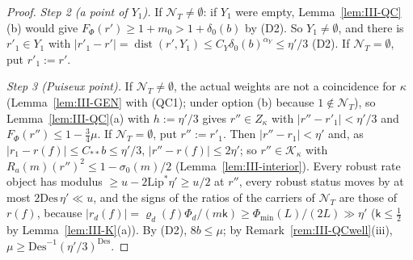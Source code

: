 \documentclass[10pt]{amsart}
\theoremstyle{definition}
\theoremstyle{remark}
\newcommand{\dist}{\operatorname{dist}}
\begin{document}
\begin{proof}
\emph{Step 2 (a point of $Y_1$).}  If $\mathcal N_T\ne\emptyset$: if $Y_1$ were
empty, Lemma~\ref{lem:III-QC}(b) would give $F_\Phi(r')\ge1+m_0>1+\delta_0(b)$
by (D2).  So $Y_1\ne\emptyset$, and there is $r'_1\in Y_1$ with $|r'_1-r'|=
\dist(r',Y_1)\le C_Y\delta_0(b)^{\alpha_Y}\le\eta'/3$ (D2).  If $\mathcal N_T=
\emptyset$, put $r'_1:=r'$.

\emph{Step 3 (Puiseux point).}  If $\mathcal N_T\ne\emptyset$, the actual weights
are not a coincidence for $\kappa$ (Lemma~\ref{lem:III-GEN} with (QC1); under
option (b) because $1\notin\mathcal N_T$), so Lemma~\ref{lem:III-QC}(a) with
$h:=\eta'/3$ gives $r''\in Z_\kappa$ with $|r''-r'_1|<\eta'/3$ and $F_\Phi(r'')\le
1-\frac34\mu$.  If $\mathcal N_T=\emptyset$, put $r'':=r'_1$.  Then $|r''-r_1|<
\eta'$ and, as $|r_1-r(f)|\le C_{**}b\le\eta'/3$, $|r''-r(f)|\le2\eta'$; so
$r''\in\mathcal K_\kappa$ with $R_a(m)(r'')^2\le1-\sigma_0(m)/2$
(Lemma~\ref{lem:III-interior}).  Every robust rate object has modulus $\ge
u-2\mathrm{Lip}^*\eta'\ge u/2$ at $r''$, every robust status
moves by at most $2\mathrm{Des}\,\eta'\ll u$, and the signs of the ratios of
the carriers of $\mathcal N_T$ are those of $r(f)$, because $|r_d(f)|=
\varrho_d(f)\Phi_d/(m\mathsf k)\ge\Phi_{\min}(L)/(2L)\gg\eta'$ ($\mathsf k\le\frac12$
by Lemma~\ref{lem:III-K}(a)).  By (D2), $8b\le\mu$; by
Remark~\ref{rem:III-QCwell}(iii), $\mu\ge\mathrm{Des}^{-1}(\eta'/3)^{\mathrm{Des}}$.


\end{proof}
\end{document}
